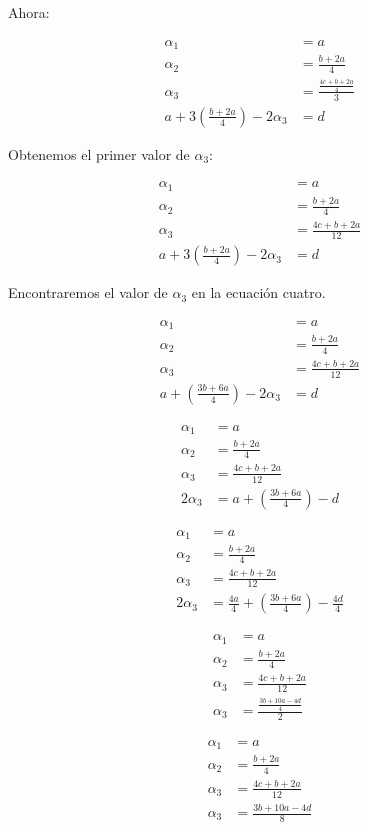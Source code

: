 \documentclass[letterpaper]{article}
\renewcommand{\*}{\cdot}
\theoremstyle{definition}
\begin{document}
Ahora:
\begin{center}
	\begin{align*}
	\alpha_{1}&=a\\
	\alpha_{2}&=\frac{b+2a}{4}\\
	\alpha_{3}&=\frac{\frac{4c+b+2a}{4}}{3}\\
	a+3(\frac{b+2a}{4})-2\alpha_{3}&=d
	\end{align*}
\end{center}
Obtenemos el primer valor de $\alpha_{3}$: 
\begin{center}
	\begin{align*}
	\alpha_{1}&=a\\
	\alpha_{2}&=\frac{b+2a}{4}\\
	\alpha_{3}&=\frac{4c+b+2a}{12}\\
	a+3(\frac{b+2a}{4})-2\alpha_{3}&=d
	\end{align*}
\end{center}
Encontraremos el valor de $\alpha_{3}$ en la ecuación cuatro.
\begin{center}
	\begin{align*}
	\alpha_{1}&=a\\
	\alpha_{2}&=\frac{b+2a}{4}\\
	\alpha_{3}&=\frac{4c+b+2a}{12}\\
	a+(\frac{3b+6a}{4})-2\alpha_{3}&=d
	\end{align*}
\end{center}
\begin{center}
	\begin{align*}
	\alpha_{1}&=a\\
	\alpha_{2}&=\frac{b+2a}{4}\\
	\alpha_{3}&=\frac{4c+b+2a}{12}\\
	2\alpha_{3}&=a+(\frac{3b+6a}{4})-d
	\end{align*}
\end{center}
\begin{center}
	\begin{align*}
	\alpha_{1}&=a\\
	\alpha_{2}&=\frac{b+2a}{4}\\
	\alpha_{3}&=\frac{4c+b+2a}{12}\\
	2\alpha_{3}&=\frac{4a}{4}+(\frac{3b+6a}{4})-\frac{4d}{4}
	\end{align*}
\end{center}
\begin{center}
	\begin{align*}
	\alpha_{1}&=a\\
	\alpha_{2}&=\frac{b+2a}{4}\\
	\alpha_{3}&=\frac{4c+b+2a}{12}\\
	\alpha_{3}&=\frac{\frac{3b+10a-4d}{4}}{2}
	\end{align*}
\end{center}
\begin{center}
	\begin{align*}
	\alpha_{1}&=a\\
	\alpha_{2}&=\frac{b+2a}{4}\\
	\alpha_{3}&=\frac{4c+b+2a}{12}\\
	\alpha_{3}&=\frac{3b+10a-4d}{8}
	\end{align*}
\end{center}
\end{document}
